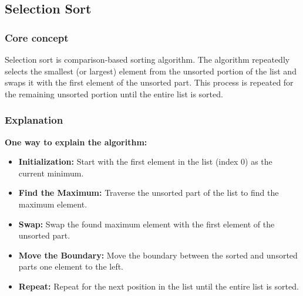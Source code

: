 \subsection{Selection Sort}

\subsubsection{Core concept}
Selection sort is comparison-based sorting algorithm. The algorithm repeatedly selects the smallest (or largest) element from the unsorted portion of the list and swaps it with the first element of the unsorted part. This process is repeated for the remaining unsorted portion until the entire list is sorted. ~\cite{ref6}

\vspace{5pt}

\subsubsection{Explanation}
\textbf{One way to explain the algorithm:} ~\cite{ref7}
\begin{itemize}
    \item \textbf{Initialization:} Start with the first element in the list (index 0) as the current minimum.
    \item \textbf{Find the Maximum:} Traverse the unsorted part of the list to find the maximum element.
    \item \textbf{Swap:} Swap the found maximum element with the first element of the unsorted part.
    \item \textbf{Move the Boundary:} Move the boundary between the sorted and unsorted parts one element to the left.
    \item \textbf{Repeat:} Repeat for the next position in the list until the entire list is sorted.
\end{itemize}

\vspace{10pt}

